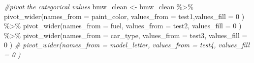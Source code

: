 \documentclass[
]{article}
\newenvironment{Shaded}{\begin{snugshade}}{\end{snugshade}}
\newcommand{\AttributeTok}[1]{\textcolor[rgb]{0.77,0.63,0.00}{#1}}
\newcommand{\CommentTok}[1]{\textcolor[rgb]{0.56,0.35,0.01}{\textit{#1}}}
\newcommand{\DecValTok}[1]{\textcolor[rgb]{0.00,0.00,0.81}{#1}}
\newcommand{\FunctionTok}[1]{\textcolor[rgb]{0.00,0.00,0.00}{#1}}
\newcommand{\NormalTok}[1]{#1}
\newcommand{\OtherTok}[1]{\textcolor[rgb]{0.56,0.35,0.01}{#1}}
\newcommand{\SpecialCharTok}[1]{\textcolor[rgb]{0.00,0.00,0.00}{#1}}
\begin{document}
\begin{Shaded}
\begin{Highlighting}[]
\CommentTok{\#pivot the categorical values}
\NormalTok{bmw\_clean }\OtherTok{\textless{}{-}}\NormalTok{ bmw\_clean }\SpecialCharTok{\%\textgreater{}\%} 
  \FunctionTok{pivot\_wider}\NormalTok{(}\AttributeTok{names\_from =}\NormalTok{ paint\_color, }\AttributeTok{values\_from =}\NormalTok{ test1,}\AttributeTok{values\_fill =} \DecValTok{0}\NormalTok{ ) }\SpecialCharTok{\%\textgreater{}\%} 
  \FunctionTok{pivot\_wider}\NormalTok{(}\AttributeTok{names\_from =}\NormalTok{ fuel, }\AttributeTok{values\_from =}\NormalTok{ test2, }\AttributeTok{values\_fill =} \DecValTok{0}\NormalTok{ ) }\SpecialCharTok{\%\textgreater{}\%}
  \FunctionTok{pivot\_wider}\NormalTok{(}\AttributeTok{names\_from =}\NormalTok{ car\_type, }\AttributeTok{values\_from =}\NormalTok{ test3, }\AttributeTok{values\_fill =} \DecValTok{0}\NormalTok{ ) }
\CommentTok{\# pivot\_wider(names\_from = model\_letter, values\_from = test4, values\_fill = 0 )}
\end{Highlighting}
\end{Shaded}
\end{document}
